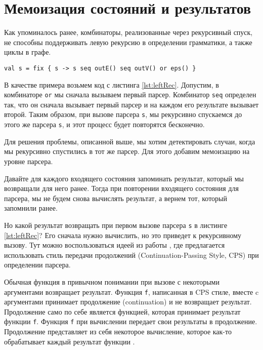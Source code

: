 \section{Мемоизация состояний и результатов}

Как упоминалось ранее, комбинаторы, реализованные через рекурсивный спуск, не способны поддерживать левую рекурсию в определении грамматики, а также циклы в графе.

\begin{lstlisting}[float=ht, label=lst:leftRec, caption=Пример левой рекурсии в грамматике]
    val s = fix { s -> s seq outE() seq outV() or eps() }
\end{lstlisting}

В качестве примера возьмем код с листинга \ref{lst:leftRec}. Допустим, в комбинаторе \texttt{or} мы сначала вызываем первый парсер. Комбинатор \texttt{seq} определен так, что он сначала вызывает первый парсер и на каждом его результате вызывает второй. Таким образом, при вызове парсера \texttt{s}, мы рекурсивно спускаемся до этого же парсера \texttt{s}, и этот процесс будет повторятся бесконечно.

Для решения проблемы, описанной выше, мы хотим детектировать случаи, когда мы рекурсивно спустились в тот же парсер. Для этого добавим мемоизацию на уровне парсера.

Давайте для каждого входящего состояния запоминать результат, который мы возвращали для него ранее. Тогда при повторении входящего состояния для парсера, мы не будем снова вычислять результат, а вернем тот, который запомнили ранее.

Но какой результат возвращать при первом вызове парсера \texttt{s} в листинге \ref{lst:leftRec}?
Его сначала нужно вычислить, но это приведет к рекурсивному вызову.
Тут можно воспользоваться идеей из работы \cite{MemoizationJohnson}, где предлагается использовать стиль передачи продолжений (Continuation-Passing Style, CPS) при определении парсера.

Обычная функция в привычном понимании при вызове с некоторыми аргументами возвращает результат. Функция \texttt{f}, написанная в CPS стиле, вместе c аргументами принимает продолжение (continuation) и не возвращает результат. Продолжение само по себе является функцией, которая принимает результат функции \texttt{f}. Функция \texttt{f} при вычислении передает свои результаты в продолжение. Продолжение представляет из себя некоторое вычисление, которое как-то обрабатывает каждый результат функции .

